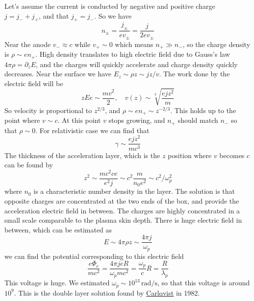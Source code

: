 \documentclass[letterpaper, 11pt]{article}
\numberwithin{equation}{section}
\numberwithin{figure}{section}
\begin{document}
Let's assume the current is conducted by negative and positive charge $j = j_{-} + j_{+}$, and that $j_+ = j_-$. So we have
\begin{equation}
    \label{eq:35}
    n_{\pm} = \frac{j_{\pm}}{ev_{\pm}} = \frac{j}{2ev_{\pm}}
\end{equation}
Near the anode $v_-\approx c$ while $v_+\sim 0$ which means $n_+\gg n_-$, so the charge density is $\rho \sim en_{+}$. High density translates to high electric field due to Gauss's law $4\pi\rho = \partial_zE$, and the charges will quickly accelerate and charge density quickly decreases. Near the surface we have $E_z \sim \rho z \sim jz/v$. The work done by the electric field will be
\begin{equation}
    \label{eq:36}
    zEe \sim \frac{mv^2}{2}, \quad v(z) \sim \sqrt[3]{\frac{ejz^2}{m}}
\end{equation}
So velocity is proportional to $z^{2/3}$, and $\rho \sim e n_+ \sim z^{-2/3}$. This holds up to the point where $v \sim c$. At this point $v$ stops growing, and $n_+$ should match $n_-$ so that $\rho \sim 0$. For relativistic case we can find that
\begin{equation}
    \label{eq:37}
    \gamma \sim \frac{ejz^2}{mc^{3}}
\end{equation}
The thickness of the acceleration layer, which is the $z$ position where $v$ becomes $c$ can be found by
\begin{equation}
    \label{eq:38}
    z^2\sim \frac{mc^2ce}{e^2j} \sim c^2\frac{m}{n_0e^2} \sim c^2/\omega_{p}^2
\end{equation}
where $n_0$ is a characteristic number density in the layer. The solution is that opposite charges are concentrated at the two ends of the box, and provide the acceleration electric field in between. The charges are highly concentrated in a small scale comparable to the plasma skin depth. There is huge electric field in between, which can be estimated as
\begin{equation}
    \label{eq:39}
    E \sim 4\pi\rho z \sim \frac{4\pi j}{\omega_p}
\end{equation}
we can find the potential corresponding to this electric field
\begin{equation}
    \label{eq:40}
    \frac{e\Phi_e}{mc^2} = \frac{4\pi j eR}{\omega_pmc^2} = \frac{\omega_p}{c}R = \frac{R}{\lambda_p}
\end{equation}
This voltage is huge. We estimated $\omega_p\sim 10^{13}\,\mathrm{rad/s}$, so that this voltage is around $10^9$. This is the double layer solution found by \href{http://adsabs.harvard.edu/abs/1982Ap%26SS..87...21C}{Carlqvist} in 1982.
\end{document}

